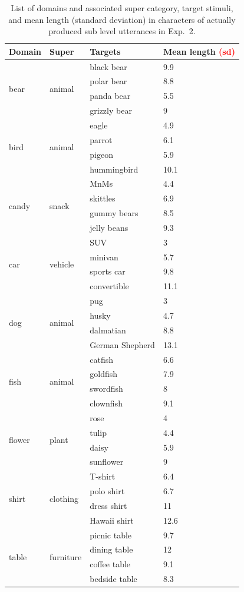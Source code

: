 \documentclass[11pt]{article}
\newcommand{\red}[1]{\textcolor{Red}{#1}}
\begin{document}
\begin{table}
\centering
\caption{List of domains and associated super category, target stimuli, and mean length (standard deviation) in characters of actually produced sub level utterances in Exp.~2.}
	\label{tab:reflevelstimuli}
	\begin{tabular}{l l l l}
	\toprule
	Domain & Super & Targets & Mean length \red{(sd)}\\
	\midrule
	\multirow{4}{*}{bear} & \multirow{4}{*}{animal} & black bear & 9.9\\
	& & polar bear & 8.8\\
	& & panda bear & 5.5\\
	& & grizzly bear & 9\\
	\midrule
	\multirow{4}{*}{bird} & \multirow{4}{*}{animal} & eagle & 4.9\\
	& 	& parrot & 6.1\\
	& & pigeon & 5.9\\
	& 	& hummingbird & 10.1\\
	\midrule
	\multirow{4}{*}{candy} & \multirow{4}{*}{snack} & MnMs & 4.4\\
		& & skittles & 6.9\\
		& & gummy bears & 8.5\\
		& & jelly beans & 9.3\\
	\midrule
	\multirow{4}{*}{car} & \multirow{4}{*}{vehicle} & SUV & 3\\
		& & minivan & 5.7\\
		& & sports car & 9.8\\
		& & convertible & 11.1\\
	\midrule
	\multirow{4}{*}{dog} & \multirow{4}{*}{animal} & pug & 3\\
		& & husky & 4.7\\
		& & dalmatian & 8.8\\
		& & German Shepherd & 13.1\\
	\midrule
	\multirow{4}{*}{fish} & \multirow{4}{*}{animal} & catfish & 6.6\\
		& & goldfish & 7.9\\
		& & swordfish & 8\\
		& & clownfish & 9.1\\
	\midrule
	\multirow{4}{*}{flower} & \multirow{4}{*}{plant} & rose & 4\\
		& & tulip & 4.4\\
		& & daisy & 5.9\\
		& & sunflower & 9\\
	\midrule
	\multirow{4}{*}{shirt} & \multirow{4}{*}{clothing} & T-shirt & 6.4\\
		& & polo shirt & 6.7\\
		& & dress shirt & 11\\
		& & Hawaii shirt & 12.6\\
	\midrule
	\multirow{4}{*}{table} & \multirow{4}{*}{furniture} & picnic table & 9.7\\
		& & dining table & 12\\
		& & coffee table & 9.1\\
		& & bedside table & 8.3\\				
	\bottomrule
	\end{tabular}
\end{table}
\end{document}

